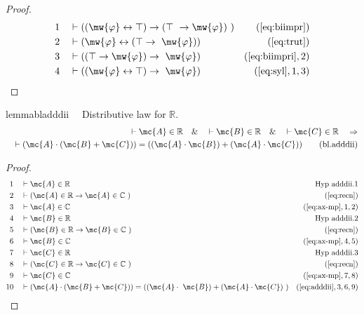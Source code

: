 \begin{proof}
\begin{align}
  1 &&  & \vdash ( ( \mw{\varphi} \leftrightarrow \top ) \rightarrow ( \top
     ~\rightarrow \mw{\varphi} )
     ~)&(\mbox{\ref{eq:biimpr}})\notag
  \\ 2 &&  & \vdash ( \mw{\varphi} \leftrightarrow ( \top \rightarrow
     ~\mw{\varphi} ) )&(\mbox{\ref{eq:trut}})\notag
  \\ 3 &&  & \vdash ( ( \top \rightarrow \mw{\varphi} ) \rightarrow
     ~\mw{\varphi} )&(\mbox{\ref{eq:biimpri}},2)\notag
  \\ 4 &&  & \vdash ( ( \mw{\varphi} \leftrightarrow \top ) \rightarrow
     ~\mw{\varphi} )&(\mbox{\ref{eq:syl}},1,3)\notag
\end{align}
\end{proof}

\begin{restatable}{lemma}{bladddii}~~ Distributive law for $\mathbb{R}$.
\begin{align}
\vdash \mc{A} \in \mathbb{R}\quad\&\quad \vdash \mc{B} \in
    \mathbb{R}\quad\&\quad \vdash \mc{C} \in \mathbb{R}\quad\Rightarrow \notag \\ 
	\quad
    \vdash ( \mc{A} \cdot ( \mc{B} + \mc{C} ) ) = ( ( \mc{A} \cdot \mc{B} ) + (
    \mc{A} \cdot \mc{C} ) )\label{eq:bl.adddii}\tag{bl.adddii}
\end{align}
\end{restatable}

\begin{proof}
\begin{align}
  1 &&  & \vdash \mc{A} \in \mathbb{R}&\text{Hyp~adddii.1}\notag%
  \\ 2 &&  & \vdash ( \mc{A} \in \mathbb{R} \rightarrow \mc{A} \in \mathbb{C}
     ~)&(\mbox{\ref{eq:recn}})\notag
  \\ 3 &&  & \vdash \mc{A} \in \mathbb{C}&(\mbox{\ref{eq:ax-mp}},1,2)\notag
  \\ 4 &&  & \vdash \mc{B} \in \mathbb{R}&\text{Hyp~adddii.2}\notag%
  \\ 5 &&  & \vdash ( \mc{B} \in \mathbb{R} \rightarrow \mc{B} \in \mathbb{C}
     ~)&(\mbox{\ref{eq:recn}})\notag
  \\ 6 &&  & \vdash \mc{B} \in \mathbb{C}&(\mbox{\ref{eq:ax-mp}},4,5)\notag
  \\ 7 &&  & \vdash \mc{C} \in \mathbb{R}&\text{Hyp~adddii.3}\notag%
  \\ 8 &&  & \vdash ( \mc{C} \in \mathbb{R} \rightarrow \mc{C} \in \mathbb{C}
     ~)&(\mbox{\ref{eq:recn}})\notag
  \\ 9 &&  & \vdash \mc{C} \in \mathbb{C}&(\mbox{\ref{eq:ax-mp}},7,8)\notag
  \\ 10 &&  & \vdash ( \mc{A} \cdot ( \mc{B} + \mc{C} ) ) = ( ( \mc{A} \cdot
     ~\mc{B} ) + ( \mc{A} \cdot \mc{C} )
     ~)&(\mbox{\ref{eq:adddii}},3,6,9)\notag
\end{align}
\end{proof}

